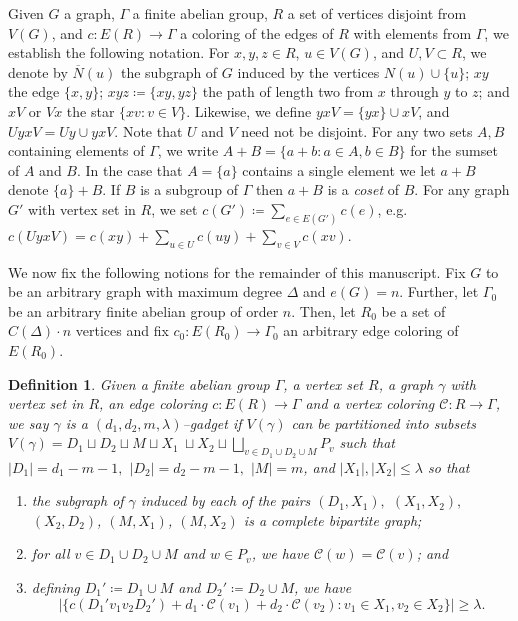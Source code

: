 \documentclass[10pt,a4paper]{amsart}
\newcommand{\cC}{\mathcal{C} }
\newtheorem{defn}{Definition}
\begin{document}
Given $G$ a graph, $\Gamma$ a finite abelian group, $R$ a set of vertices disjoint from $V(G)$, and $c:E(R)\to \Gamma$ a coloring of the edges of $R$ with elements from $\Gamma$, we establish the following notation. For $x,y,z\in R$, $u\in V(G)$, and $U,V\subset R$, we denote by $\overline{N}(u)$ the subgraph of $G$ induced by the vertices $N(u) \cup \{u\}$;  $xy$ the edge $\{x,y\}$;  $xyz\coloneqq \{xy,yz\}$  the path of length two from $x$ through $y$ to $z$; and $xV$ or $Vx$ the star $\{xv:v\in V\}$. Likewise, we define $yxV=\{yx\}\cup xV$, and $UyxV=Uy \cup yxV$. Note that $U$ and $V$ need not be disjoint. For any two sets $A, B$ containing elements of $\Gamma$, we write $A + B = \{a + b: a \in A, b \in B\}$ for the sumset of $A$ and $B$. In the case that $A =\{a\}$ contains a single element we let $a + B$ denote $\{a\} + B$. If $B$ is a subgroup of $\Gamma$ then $a + B$ is a \emph{coset} of $B$. For any graph $G'$ with vertex set in $R$, we set $c(G') \coloneqq  \sum_{e\in E(G')} c(e)$, e.g. $c(UyxV)=c(xy) +\sum_{u\in U} c(uy) +\sum_{v\in V} c(xv).$

We now fix the following notions for the remainder of this manuscript. 
Fix $G$ to be an arbitrary graph with maximum degree $\Delta$ and $e(G)=n$. Further, let $\Gamma_0$ be an arbitrary finite abelian group of order $n$. Then, let $R_0$ be a set of $C(\Delta)\cdot n$ vertices and fix $c_0:E(R_0)\to \Gamma_0$ an arbitrary edge coloring of $E(R_0)$.

\begin{defn} \label{def:gadgets}
    Given a finite abelian group $\Gamma$, a vertex set $R$, a graph $\gamma$ with vertex set in $R$, an edge coloring $c: E(R) \to \Gamma$ and a vertex coloring $\cC:R \to \Gamma$, we say $\gamma$ is a $(d_1,d_2,m,\lambda)$--\emph{gadget} if $V(\gamma)$ can be partitioned into subsets $V(\gamma)=D_1 \sqcup D_2 \sqcup M \sqcup X_1\ \sqcup X_2 \sqcup \bigsqcup_{v\in D_1 \cup D_2 \cup M} P_v$ such that $|D_1|=d_1-m-1,$ $|D_2|=d_2-m-1,$ $|M|=m$, and $|X_1|,|X_2|\leq \lambda$ so that
    
    \begin{enumerate}
        \item the subgraph of $\gamma$ induced by each of the pairs $(D_1,X_1),$ $(X_1,X_2),$ $(X_2,D_2)$, $(M,X_1)$, $(M,X_2)$ is a complete bipartite graph;
        \item for all $v\in D_1\cup D_2\cup M$ and $w\in P_v$, we have $\cC(w)=\cC(v)$; and
        \item defining $D_1'\coloneqq D_1\cup M$ and $D_2'\coloneqq  D_2\cup M$, we  have
        \begin{equation}\label{colorful}|\{c(D_1'v_1v_2D_2') +  d_1\cdot \cC(v_1) + d_2\cdot \cC(v_2):v_1\in X_1,v_2\in X_2\}|\geq \lambda.
    \end{equation}
    \end{enumerate}
\end{defn}
\end{document}
